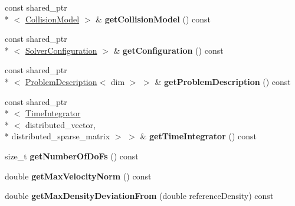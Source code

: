 \begin{DoxyCompactItemize}
\item 
\hypertarget{classnatrium_1_1CFDSolver_abb4b632b524bd68afcdff7d54c2d3d97}{const shared\-\_\-ptr\\*
$<$ \hyperlink{classnatrium_1_1CollisionModel}{Collision\-Model} $>$ \& {\bfseries get\-Collision\-Model} () const }\label{classnatrium_1_1CFDSolver_abb4b632b524bd68afcdff7d54c2d3d97}

\item 
\hypertarget{classnatrium_1_1CFDSolver_a413691491ac82f384a03293be2294de5}{const shared\-\_\-ptr\\*
$<$ \hyperlink{classnatrium_1_1SolverConfiguration}{Solver\-Configuration} $>$ \& {\bfseries get\-Configuration} () const }\label{classnatrium_1_1CFDSolver_a413691491ac82f384a03293be2294de5}

\item 
\hypertarget{classnatrium_1_1CFDSolver_a8b1131e8fd6b022bea5ddce72469c289}{const shared\-\_\-ptr\\*
$<$ \hyperlink{classnatrium_1_1ProblemDescription}{Problem\-Description}$<$ dim $>$ $>$ \& {\bfseries get\-Problem\-Description} () const }\label{classnatrium_1_1CFDSolver_a8b1131e8fd6b022bea5ddce72469c289}

\item 
\hypertarget{classnatrium_1_1CFDSolver_af1b1ca6771029003bc9bac7cfe0b4d3c}{const shared\-\_\-ptr\\*
$<$ \hyperlink{classnatrium_1_1TimeIntegrator}{Time\-Integrator}\\*
$<$ distributed\-\_\-vector, \\*
distributed\-\_\-sparse\-\_\-matrix $>$ $>$ \& {\bfseries get\-Time\-Integrator} () const }\label{classnatrium_1_1CFDSolver_af1b1ca6771029003bc9bac7cfe0b4d3c}

\item 
\hypertarget{classnatrium_1_1CFDSolver_a74d459ef4f43d42e04ceb2178bb006f4}{size\-\_\-t {\bfseries get\-Number\-Of\-Do\-Fs} () const }\label{classnatrium_1_1CFDSolver_a74d459ef4f43d42e04ceb2178bb006f4}

\item 
\hypertarget{classnatrium_1_1CFDSolver_ae9c44bb0f33e2c73ee96fbe100061842}{double {\bfseries get\-Max\-Velocity\-Norm} () const }\label{classnatrium_1_1CFDSolver_ae9c44bb0f33e2c73ee96fbe100061842}

\item 
\hypertarget{classnatrium_1_1CFDSolver_ade641431988a82cb47d88a9d600e1c92}{double {\bfseries get\-Max\-Density\-Deviation\-From} (double reference\-Density) const }\label{classnatrium_1_1CFDSolver_ade641431988a82cb47d88a9d600e1c92}


\end{DoxyCompactItemize}
